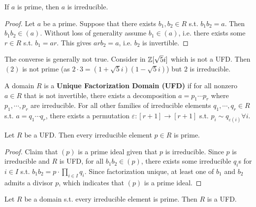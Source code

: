 \begin{proposition}\label{prop:prime is irreducible}
    If $a$ is prime, then $a$ is irreducible.
\end{proposition}

\begin{proof}
    Let $a$ be a prime. Suppose that there exists $b_1, b_2\in R$ s.t. $b_1 b_2 = a$. Then $b_1 b_2 \in (a)$. Without loss of generality assume $b_1\in (a)$, i.e. there exists some $r\in R$ s.t. $b_1 = ar$. This gives $arb_2 = a$, i.e. $b_2$ is invertible.
\end{proof}

\begin{remark}
    The converse is generally not true. Consider in $\mathbb{Z}[\sqrt{5}i]$ which is not a UFD. Then $(2)$ is not prime (as $2\cdot 3 = (1 + \sqrt{5}i)(1 - \sqrt{5}i)$) but $2$ is irreducible.
\end{remark}

\begin{definition}
    A domain $R$ is a \textbf{Unique Factorization Domain (UFD)} if for all  nonzero $a\in R$ that is not invertible, there exists a decomposition $a = p_1\cdots p_r$ where $p_1, \cdots, p_r$ are irreducible. For all other families of irreducible elements $q_1, \cdots, q_r \in R$ s.t. $a = q_1\cdots q_r$, there exists a permutation $\varepsilon: [r+1] \to [r+1]$ s.t. $p_i \sim q_{\varepsilon(i)} \forall i$. 
\end{definition}

\begin{proposition}\label{prop:UFD irreducible is prime}
    Let $R$ be a UFD. Then every irreducible element $p\in R$ is prime.    
\end{proposition}

\begin{proof}
    Claim that $(p)$ is a prime ideal given that $p$ is irreducible. Since $p$ is irreducible and $R$ is UFD, for all $b_1 b_2\in (p)$, there exists some irreducible $q_i$s for $i\in I$ s.t. $b_1 b_2 = p\cdot \prod_{i\in I} q_i$. Since factorization unique, at least one of $b_1$ and $b_2$ admits a divisor $p$, which indicates that $(p)$ is a prime ideal. 
\end{proof}

\begin{proposition}\label{prop:irreducible is prime implies UFD}
    Let $R$ be a domain s.t. every irreducible element is prime. Then $R$ is a UFD.
\end{proposition}

